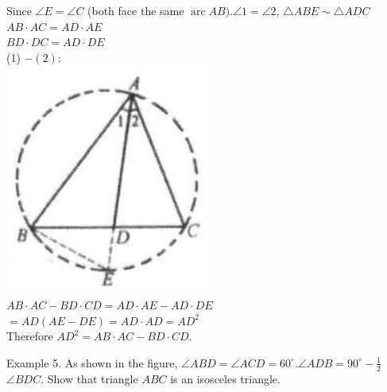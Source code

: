 \documentclass[10pt]{article}
\begin{document}
Since \(\angle E=\angle C\) (both face the same \(\operatorname{arc} A B) . \angle 1=\angle 2\), \(\triangle A B E \sim \triangle A D C\)\\
\(A B \cdot A C=A D \cdot A E\)\\
\(B D \cdot D C=A D \cdot D E\)\\
(1) \(-(2):\)\\
\includegraphics[max width=\textwidth, center]{2025_04_17_97bc1f7e44d93c271a88g-196(1)}\\
\(A B \cdot A C-B D \cdot C D=A D \cdot A E-A D \cdot D E\)\\
\(=A D(A E-D E)=A D \cdot A D=A D^{2}\)\\
Therefore \(A D^{2}=A B \cdot A C-B D \cdot C D\).

Example 5. As shown in the figure, \(\angle A B D=\angle A C D=60^{\circ} . \angle A D B=90^{\circ}-\frac{1}{2}\) \(\angle B D C\). Show that triangle \(A B C\) is an isosceles triangle.
\end{document}
